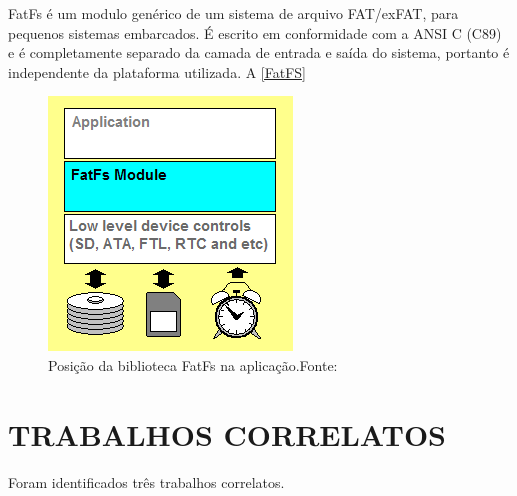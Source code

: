 FatFs é um modulo genérico de um sistema de arquivo FAT/exFAT, para pequenos sistemas embarcados. É escrito em conformidade com a ANSI C (C89) e é completamente separado da camada de entrada e saída do sistema, portanto é independente da plataforma utilizada. A \autoref{FatFS}


\begin{figure}[H]
    \scriptsize
     \centering
     \includegraphics[scale=0.5]{dados/figuras/fatfs.png}
     \caption{Posição da biblioteca FatFs na aplicação.\newline  Fonte:\cite{FATFS}}
     \label{FatFS}
\end{figure}




\section{TRABALHOS CORRELATOS}

Foram identificados três trabalhos correlatos.


